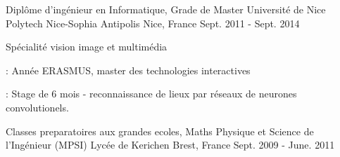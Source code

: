 \begin{cventries}
  \cventry
    {Diplôme d'ingénieur en Informatique, Grade de Master} %
    {Université de Nice Polytech Nice-Sophia Antipolis} %
    {Nice, France} %
    {Sept. 2011 - Sept. 2014} %
    {
      \begin{cvitems} %
        \item Spécialité vision image et multimédia
        \item {}: Année ERASMUS, master des technologies interactives
        \item {}: Stage de 6 mois - reconnaissance de lieux par réseaux de neurones convolutionels.
      \end{cvitems}
    }


  \cventry
    {Classes preparatoires aux grandes ecoles, Maths Physique et Science de l'Ingénieur (MPSI)} %
    {Lycée de Kerichen} %
    {Brest, France} %
    {Sept. 2009 - June. 2011} %
    {}
\end{cventries}
